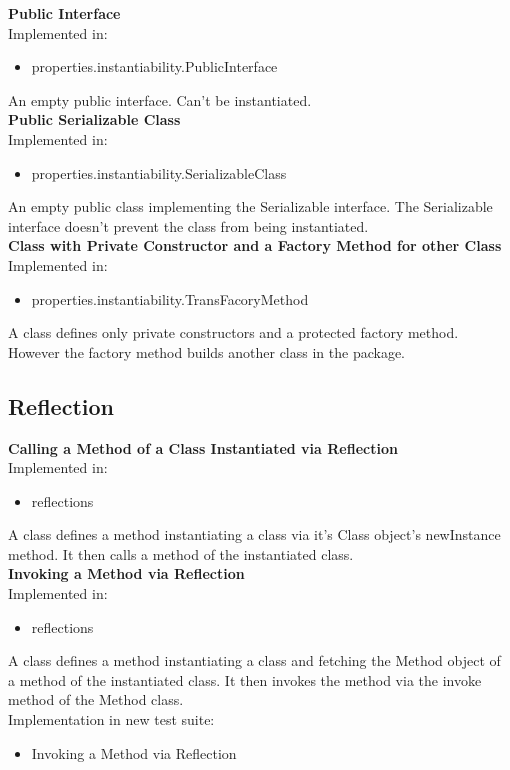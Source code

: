\documentclass{article}
\begin{document}
\noindent
\textbf{Public Interface}\\
Implemented in: 
\begin{itemize}
    \item properties.instantiability.PublicInterface
\end{itemize}
An empty public interface. Can't be instantiated.\\

\noindent
\textbf{Public Serializable Class}\\
Implemented in: 
\begin{itemize}
    \item properties.instantiability.SerializableClass
\end{itemize}
An empty public class implementing the Serializable interface. The Serializable interface doesn't prevent the class from being instantiated.\\

\noindent
\textbf{Class with Private Constructor and a Factory Method for other Class}\\
Implemented in: 
\begin{itemize}
    \item properties.instantiability.TransFacoryMethod
\end{itemize}
A class defines only private constructors and a protected factory method. However the factory method builds another class in the package.\\

\subsection{Reflection}

\textbf{Calling a Method of a Class Instantiated via Reflection}\\
Implemented in: 
\begin{itemize}
    \item reflections
\end{itemize}
A class defines a method instantiating a class via it's Class object's newInstance method. It then calls a method of the instantiated class.\\

\noindent
\textbf{Invoking a Method via Reflection}\\
Implemented in: 
\begin{itemize}
    \item reflections
\end{itemize}
A class defines a method instantiating a class and fetching the Method object of a method of the instantiated class. It then invokes the method via the invoke method of the Method class.\\
Implementation in new test suite: 
\begin{itemize}
    \item Invoking a Method via Reflection
\end{itemize}
\end{document}
